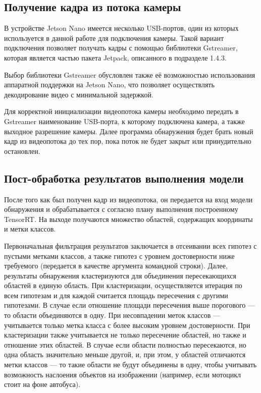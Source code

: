 \subsection{Получение кадра из потока камеры}

В устройстве Jetson Nano имеется несколько USB-портов, один из которых используется в данной работе для подключения камеры. Такой вариант подключения позволяет получать кадры с помощью библиотеки Gstreamer, которая является частью пакета Jetpack, описанного в подразделе 1.4.3. 

Выбор библиотеки Gstreamer обусловлен также её возможностью использования аппаратной поддержки на Jetson Nano, что позволяет осуществлять декодирование видео с минимальной задержкой.

Для корректной инициализации видеопотока камеры необходимо передать в Gstreamer наименование USB-порта, к которому подключена камера, а также выходное разрешение камеры. Далее программа обнаружения будет брать новый кадр из видеопотока до тех пор, пока поток не будет закрыт или принудительно остановлен.

\subsection{Пост-обработка результатов выполнения модели}

После того как был получен кадр из видеопотока, он передается на вход модели обнаружения и обрабатывается с согласно плану выполнения построенному TensorRT. На выходе получаются множество областей, содержащих координаты и метки классов. 

Первоначальная фильтрация результатов заключается в отсеивании всех гипотез с пустыми метками классов, а также гипотез с уровнем достоверности ниже требуемого (передается в качестве аргумента командной строки). Далее, результаты обнаружения кластеризуются для объединения пересекающихся областей в единую область. При кластеризации, осуществляется итерация по всем гипотезам и для каждой считается площадь пересечения с другими гипотезами. В случае если отношение площади пересечения выше порогового — то области объединяются в одну. При несовпадении меток классов — учитывается только метка класса с более высоким уровнем достоверности. При кластеризации также учитывается не только пересечение областей, но также и отношение этих областей. В случае если области полностью пересекаются, но одна область значительно меньше другой, и, при этом, у областей отличаются метки классов — то такие области не будут объединены в одну, чтобы учитывать возможность наслоения объектов на изображении (например, если мотоцикл стоит на фоне автобуса).

